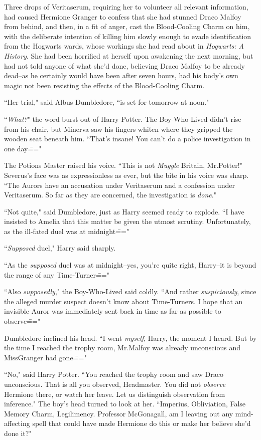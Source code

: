 Three drops of Veritaserum, requiring her to volunteer all relevant information, had caused Hermione Granger to confess that she had stunned Draco Malfoy from behind, and then, in a fit of anger, cast the Blood-Cooling Charm on him, with the deliberate intention of killing him slowly enough to evade identification from the Hogwarts wards, whose workings she had read about in \emph{Hogwarts: A History}. She had been horrified at herself upon awakening the next morning, but had not told anyone of what she'd done, believing Draco Malfoy to be already dead\---as he certainly would have been after seven hours, had his body's own magic not been resisting the effects of the Blood-Cooling Charm.

``Her trial," said Albus Dumbledore, ``is set for tomorrow at noon."

``\emph{What?}" the word burst out of Harry Potter. The Boy-Who-Lived didn't rise from his chair, but Minerva saw his fingers whiten where they gripped the wooden seat beneath him. ``That's insane! You can't do a police investigation in one day\==="

The Potions Master raised his voice. ``This is not \emph{Muggle} Britain, Mr.\?Potter!" Severus's face was as expressionless as ever, but the bite in his voice was sharp. ``The Aurors have an accusation under Veritaserum and a confession under Veritaserum. So far as they are concerned, the investigation is \emph{done}."

``Not quite," said Dumbledore, just as Harry seemed ready to explode. ``I have insisted to Amelia that this matter be given the utmost scrutiny. Unfortunately, as the ill-fated duel was at midnight\==="

``\emph{Supposed} duel," Harry said sharply.

``As the \emph{supposed} duel was at midnight\---yes, you're quite right, Harry\---it is beyond the range of any Time-Turner\==="

``Also \emph{supposedly}," the Boy-Who-Lived said coldly. ``And rather \emph{suspiciously}, since the alleged murder suspect doesn't know about Time-Turners. I hope that an invisible Auror was immediately sent back in time as far as possible to observe\==="

Dumbledore inclined his head. ``I went \emph{myself}, Harry, the moment I heard. But by the time I reached the trophy room, Mr.\?Malfoy was already unconscious and Miss\?Granger had gone\==="

``No," said Harry Potter. ``You reached the trophy room and saw Draco unconscious. That is all you observed, Headmaster. You did not \emph{observe} Hermione there, or watch her leave. Let us distinguish observation from inference." The boy's head turned to look at her. ``Imperius, Obliviation, False Memory Charm, Legilimency. Professor McGonagall, am I leaving out any mind-affecting spell that could have made Hermione do this or make her believe she'd done it?"

